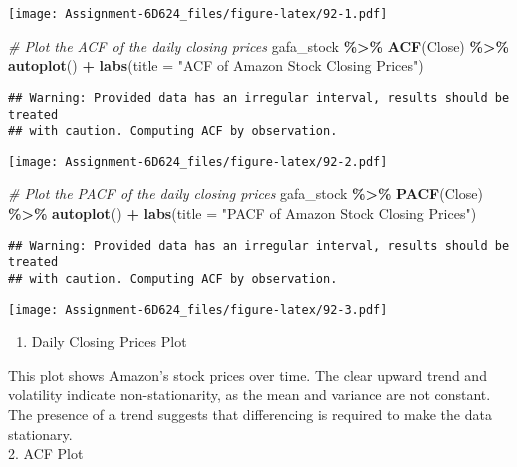 \documentclass[
]{article}
\newenvironment{Shaded}{\begin{snugshade}}{\end{snugshade}}
\newcommand{\AttributeTok}[1]{\textcolor[rgb]{0.13,0.29,0.53}{#1}}
\newcommand{\CommentTok}[1]{\textcolor[rgb]{0.56,0.35,0.01}{\textit{#1}}}
\newcommand{\FunctionTok}[1]{\textcolor[rgb]{0.13,0.29,0.53}{\textbf{#1}}}
\newcommand{\NormalTok}[1]{#1}
\newcommand{\SpecialCharTok}[1]{\textcolor[rgb]{0.81,0.36,0.00}{\textbf{#1}}}
\newcommand{\StringTok}[1]{\textcolor[rgb]{0.31,0.60,0.02}{#1}}
\providecommand{\tightlist}{%
  \setlength{\itemsep}{0pt}\setlength{\parskip}{0pt}}
\begin{document}
\texttt{[image: Assignment-6D624\_files/figure-latex/92-1.pdf]}

\begin{Shaded}
\begin{Highlighting}[]
\CommentTok{\# Plot the ACF of the daily closing prices}
\NormalTok{gafa\_stock }\SpecialCharTok{\%\textgreater{}\%} 
  \FunctionTok{ACF}\NormalTok{(Close) }\SpecialCharTok{\%\textgreater{}\%}
  \FunctionTok{autoplot}\NormalTok{() }\SpecialCharTok{+}
  \FunctionTok{labs}\NormalTok{(}\AttributeTok{title =} \StringTok{"ACF of Amazon Stock Closing Prices"}\NormalTok{)}
\end{Highlighting}
\end{Shaded}

\begin{verbatim}
## Warning: Provided data has an irregular interval, results should be treated
## with caution. Computing ACF by observation.
\end{verbatim}

\texttt{[image: Assignment-6D624\_files/figure-latex/92-2.pdf]}

\begin{Shaded}
\begin{Highlighting}[]
\CommentTok{\# Plot the PACF of the daily closing prices}
\NormalTok{gafa\_stock }\SpecialCharTok{\%\textgreater{}\%}
  \FunctionTok{PACF}\NormalTok{(Close) }\SpecialCharTok{\%\textgreater{}\%}
  \FunctionTok{autoplot}\NormalTok{() }\SpecialCharTok{+}
  \FunctionTok{labs}\NormalTok{(}\AttributeTok{title =} \StringTok{"PACF of Amazon Stock Closing Prices"}\NormalTok{)}
\end{Highlighting}
\end{Shaded}

\begin{verbatim}
## Warning: Provided data has an irregular interval, results should be treated
## with caution. Computing ACF by observation.
\end{verbatim}

\texttt{[image: Assignment-6D624\_files/figure-latex/92-3.pdf]}

\begin{enumerate}
\def\labelenumi{\arabic{enumi}.}
\tightlist
\item
  Daily Closing Prices Plot
\end{enumerate}

This plot shows Amazon's stock prices over time. The clear upward trend
and volatility indicate non-stationarity, as the mean and variance are
not constant. The presence of a trend suggests that differencing is
required to make the data stationary.\\
2. ACF Plot
\end{document}
